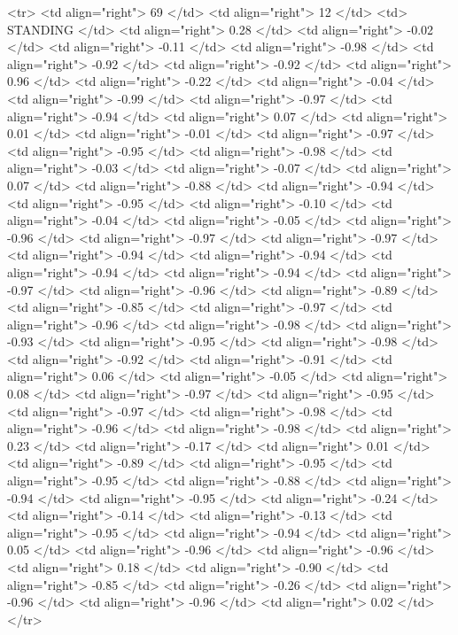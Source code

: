   <tr> <td align="right"> 69 </td> <td align="right">  12 </td> <td> STANDING </td> <td align="right"> 0.28 </td> <td align="right"> -0.02 </td> <td align="right"> -0.11 </td> <td align="right"> -0.98 </td> <td align="right"> -0.92 </td> <td align="right"> -0.92 </td> <td align="right"> 0.96 </td> <td align="right"> -0.22 </td> <td align="right"> -0.04 </td> <td align="right"> -0.99 </td> <td align="right"> -0.97 </td> <td align="right"> -0.94 </td> <td align="right"> 0.07 </td> <td align="right"> 0.01 </td> <td align="right"> -0.01 </td> <td align="right"> -0.97 </td> <td align="right"> -0.95 </td> <td align="right"> -0.98 </td> <td align="right"> -0.03 </td> <td align="right"> -0.07 </td> <td align="right"> 0.07 </td> <td align="right"> -0.88 </td> <td align="right"> -0.94 </td> <td align="right"> -0.95 </td> <td align="right"> -0.10 </td> <td align="right"> -0.04 </td> <td align="right"> -0.05 </td> <td align="right"> -0.96 </td> <td align="right"> -0.97 </td> <td align="right"> -0.97 </td> <td align="right"> -0.94 </td> <td align="right"> -0.94 </td> <td align="right"> -0.94 </td> <td align="right"> -0.94 </td> <td align="right"> -0.97 </td> <td align="right"> -0.96 </td> <td align="right"> -0.89 </td> <td align="right"> -0.85 </td> <td align="right"> -0.97 </td> <td align="right"> -0.96 </td> <td align="right"> -0.98 </td> <td align="right"> -0.93 </td> <td align="right"> -0.95 </td> <td align="right"> -0.98 </td> <td align="right"> -0.92 </td> <td align="right"> -0.91 </td> <td align="right"> 0.06 </td> <td align="right"> -0.05 </td> <td align="right"> 0.08 </td> <td align="right"> -0.97 </td> <td align="right"> -0.95 </td> <td align="right"> -0.97 </td> <td align="right"> -0.98 </td> <td align="right"> -0.96 </td> <td align="right"> -0.98 </td> <td align="right"> 0.23 </td> <td align="right"> -0.17 </td> <td align="right"> 0.01 </td> <td align="right"> -0.89 </td> <td align="right"> -0.95 </td> <td align="right"> -0.95 </td> <td align="right"> -0.88 </td> <td align="right"> -0.94 </td> <td align="right"> -0.95 </td> <td align="right"> -0.24 </td> <td align="right"> -0.14 </td> <td align="right"> -0.13 </td> <td align="right"> -0.95 </td> <td align="right"> -0.94 </td> <td align="right"> 0.05 </td> <td align="right"> -0.96 </td> <td align="right"> -0.96 </td> <td align="right"> 0.18 </td> <td align="right"> -0.90 </td> <td align="right"> -0.85 </td> <td align="right"> -0.26 </td> <td align="right"> -0.96 </td> <td align="right"> -0.96 </td> <td align="right"> 0.02 </td> </tr>
